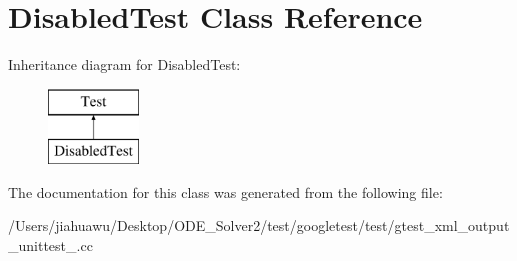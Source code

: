 \hypertarget{class_disabled_test}{}\section{Disabled\+Test Class Reference}
\label{class_disabled_test}
Inheritance diagram for Disabled\+Test\+:\begin{figure}[H]
\begin{center}
\leavevmode
\includegraphics[height=2.000000cm]{class_disabled_test}
\end{center}
\end{figure}


The documentation for this class was generated from the following file\+:\begin{DoxyCompactItemize}
\item 
/\+Users/jiahuawu/\+Desktop/\+O\+D\+E\+\_\+\+Solver2/test/googletest/test/gtest\+\_\+xml\+\_\+output\+\_\+unittest\+\_\+.\+cc\end{DoxyCompactItemize}
